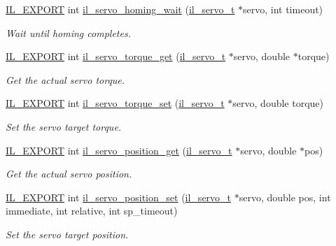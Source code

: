 \begin{DoxyCompactItemize}
\hyperlink{common_8h_a6bb629d26c52bfe10519ba3176853f47}{I\+L\+\_\+\+E\+X\+P\+O\+RT} int \hyperlink{group__IL__SERVO_gad55d208e57e674e0c1a31b995563e96d}{il\+\_\+servo\+\_\+homing\+\_\+wait} (\hyperlink{group__IL__SERVO_ga3369ddfcc33492fe3a28f96cf455b13e}{il\+\_\+servo\+\_\+t} $\ast$servo, int timeout)
\begin{DoxyCompactList}\small\item\em Wait until homing completes. \end{DoxyCompactList}\item 
\hyperlink{common_8h_a6bb629d26c52bfe10519ba3176853f47}{I\+L\+\_\+\+E\+X\+P\+O\+RT} int \hyperlink{group__IL__SERVO_ga77eb2ebb33ac5bc9e3eac7b3ae90e25b}{il\+\_\+servo\+\_\+torque\+\_\+get} (\hyperlink{group__IL__SERVO_ga3369ddfcc33492fe3a28f96cf455b13e}{il\+\_\+servo\+\_\+t} $\ast$servo, double $\ast$torque)
\begin{DoxyCompactList}\small\item\em Get the actual servo torque. \end{DoxyCompactList}\item 
\hyperlink{common_8h_a6bb629d26c52bfe10519ba3176853f47}{I\+L\+\_\+\+E\+X\+P\+O\+RT} int \hyperlink{group__IL__SERVO_gaf5be5c151da47f8a017ee8fe667ad84f}{il\+\_\+servo\+\_\+torque\+\_\+set} (\hyperlink{group__IL__SERVO_ga3369ddfcc33492fe3a28f96cf455b13e}{il\+\_\+servo\+\_\+t} $\ast$servo, double torque)
\begin{DoxyCompactList}\small\item\em Set the servo target torque. \end{DoxyCompactList}\item 
\hyperlink{common_8h_a6bb629d26c52bfe10519ba3176853f47}{I\+L\+\_\+\+E\+X\+P\+O\+RT} int \hyperlink{group__IL__SERVO_gabf1b0cdad34399c230963e1e9783f419}{il\+\_\+servo\+\_\+position\+\_\+get} (\hyperlink{group__IL__SERVO_ga3369ddfcc33492fe3a28f96cf455b13e}{il\+\_\+servo\+\_\+t} $\ast$servo, double $\ast$pos)
\begin{DoxyCompactList}\small\item\em Get the actual servo position. \end{DoxyCompactList}\item 
\hyperlink{common_8h_a6bb629d26c52bfe10519ba3176853f47}{I\+L\+\_\+\+E\+X\+P\+O\+RT} int \hyperlink{group__IL__SERVO_ga24af5dbdebb7a56f73070781d53e2d76}{il\+\_\+servo\+\_\+position\+\_\+set} (\hyperlink{group__IL__SERVO_ga3369ddfcc33492fe3a28f96cf455b13e}{il\+\_\+servo\+\_\+t} $\ast$servo, double pos, int immediate, int relative, int sp\+\_\+timeout)
\begin{DoxyCompactList}\small\item\em Set the servo target position. \end{DoxyCompactList}\item 

\end{DoxyCompactItemize}

